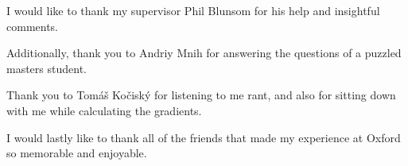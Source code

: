 \begin{acknowledgements}

I would like to thank my supervisor Phil Blunsom for his help and insightful comments.

Additionally, thank you to Andriy Mnih for answering the questions of a puzzled masters student.

Thank you to Tom{\'a}\v{s} Ko\v{c}isk{\'y} for listening to me rant, and also for sitting down with me while calculating the gradients. 

I would lastly like to thank all of the friends that made my experience at Oxford so memorable and enjoyable.

\end{acknowledgements}